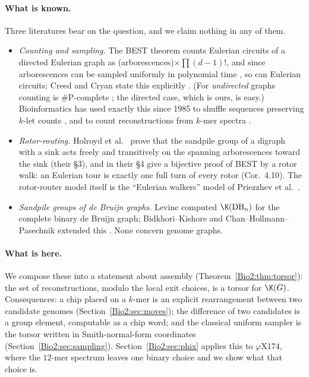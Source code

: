 \paragraph{What is known.} Three literatures bear on the question, and we claim nothing in
any of them.
\begin{itemize}
\item \emph{Counting and sampling.} The BEST theorem \cite{AEdB,SmithTutte} counts Eulerian
circuits of a directed Eulerian graph as (arborescences)$\times\prod(d-1)!$, and since
arborescences can be sampled uniformly in polynomial time \cite{CMN,PW,Wilson}, so can
Eulerian circuits; Creed and Cryan state this explicitly \cite{CC}. (For \emph{undirected}
graphs counting is $\#$P-complete \cite{BW}; the directed case, which is ours, is easy.)
Bioinformatics has used exactly this since 1985 to shuffle sequences preserving $k$-let
counts \cite{AE,KMUW,uShuffle}, and to count reconstructions from $k$-mer spectra
\cite{ABCS,KSP}.
\item \emph{Rotor-routing.} Holroyd et al.\ \cite{HLMPPW} prove that the sandpile group of a
digraph with a sink acts freely and transitively on the spanning arborescences toward the
sink (their \S3), and in their \S4 give a bijective proof of BEST by a rotor walk: an
Eulerian tour is exactly one full turn of every rotor (Cor.~4.10). The rotor-router model
itself is the ``Eulerian walkers'' model of Priezzhev et al.\ \cite{PDDK}.
\item \emph{Sandpile groups of de Bruijn graphs.} Levine \cite{Levine} computed
$\K(\mathrm{DB}_n)$ for the complete binary de Bruijn graph; Bidkhori--Kishore and
Chan--Hollmann--Pasechnik extended this \cite{BK,CHP}. None concern genome graphs.
\end{itemize}

\paragraph{What is here.} We compose these into a statement about assembly
(Theorem~\ref{Bio2:thm:torsor}): the set of reconstructions, modulo the local exit choices, is
a torsor for $\K(G)$. Consequences: a chip placed on a $k$-mer is an explicit
rearrangement between two candidate genomes (Section~\ref{Bio2:sec:moves}); the difference of
two candidates is a group element, computable as a chip word; and the classical uniform
sampler is the torsor written in Smith-normal-form coordinates
(Section~\ref{Bio2:sec:sampling}). Section~\ref{Bio2:sec:phix} applies this to $\varphi$X174, where
the $12$-mer spectrum leaves one binary choice and we show what that choice is.

